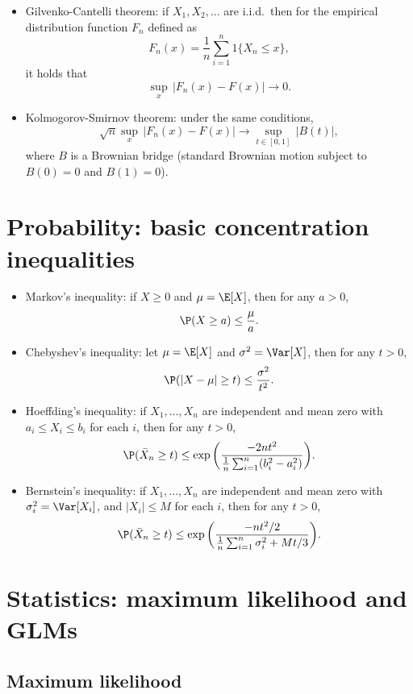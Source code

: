 \documentclass{article}
\begin{document}
\begin{itemize}
\item Gilvenko-Cantelli theorem: if $X_1,X_2,\dots$ are i.i.d.\ then for the
  empirical distribution function $F_n$ defined as 
  \[
  F_n(x) = \frac{1}{n} \sum_{i=1}^n 1\{X_n \leq x\},
  \]
  it holds that
  \[
  \sup_x \, |F_n(x) - F(x)| \to 0.
  \]

\item Kolmogorov-Smirnov theorem: under the same conditions, 
  \[
  \sqrt{n} \sup_x \, |F_n(x) - F(x)| \to \sup_{t \in [0,1]} \, |B(t)|,
  \]
  where $B$ is a Brownian bridge (standard Brownian motion subject to $B(0) =
  0$ and $B(1) = 0$).   
\end{itemize}

\section{Probability: basic concentration inequalities} 

\begin{itemize}
\item Markov's inequality: if $X \geq 0$ and $\mu = \E[X]$, then for any
  $a > 0$, 
  \[
  \P(X \geq a) \leq \frac{\mu}{a}.
  \]
  
\item Chebyshev's inequality: let $\mu = \E[X]$ and $\sigma^2 = \Var[X]$, then 
  for any $t > 0$,  
  \[
  \P(|X - \mu| \geq t) \leq \frac{\sigma^2}{t^2}.
  \]

\item Hoeffding's inequality: if $X_1,\dots,X_n$ are independent and mean zero
  with $a_i \leq X_i \leq b_i$ for each $i$, then for any $t > 0$,
  \[
  \P( \bar{X}_n \geq t) \leq \exp\bigg( \frac{-2nt^2}{
    \frac{1}{n}\sum_{i=1}^n (b_i^2 - a_i^2)} \bigg).
  \]

\item Bernstein's inequality: if $X_1,\dots,X_n$ are independent and mean zero
  with $\sigma_i^2 = \Var[X_i]$, and $|X_i| \leq M$ for each $i$, then for any
  $t > 0$,  
  \[
  \P( \bar{X}_n \geq t) \leq \exp\bigg( \frac{-nt^2/2}{
    \frac{1}{n}\sum_{i=1}^n \sigma_i^2 + Mt/3} \bigg).
  \]
\end{itemize}

\section{Statistics: maximum likelihood and GLMs}

\subsection{Maximum likelihood}
\end{document}
